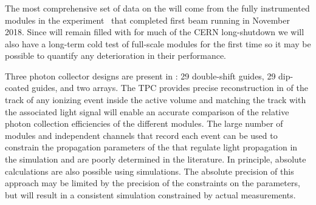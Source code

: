 
\subsubsection{}
\label{sec:valid-pdsp}

The most comprehensive set of data on the  will come from the fully instrumented modules in the  experiment~\cite{Abi:2017aow} that completed first beam running in November \num{2018}. 
Since  will remain filled with \lar for much of the CERN long-shutdown we will also have a long-term cold test of full-scale  modules for the first time so it may be possible to quantify any deterioration in their performance.

Three photon collector designs are present in : \num{29} double-shift guides, \num{29} dip-coated guides, and two  arrays. 
The TPC provides precise reconstruction in \threed of the track of any ionizing event inside the active volume and matching the track with the associated light signal will enable an accurate comparison of the relative photon collection efficiencies of the different  modules. 
The large number of modules and independent channels that record each event can be used to constrain the propagation parameters of the \lar that regulate  light propagation in the simulation and are poorly determined in the literature. %
In principle, absolute calculations are also possible using  simulations.
The absolute precision of this approach may be limited by the precision of the constraints on the parameters, but will result in a consistent simulation constrained by actual measurements. 

